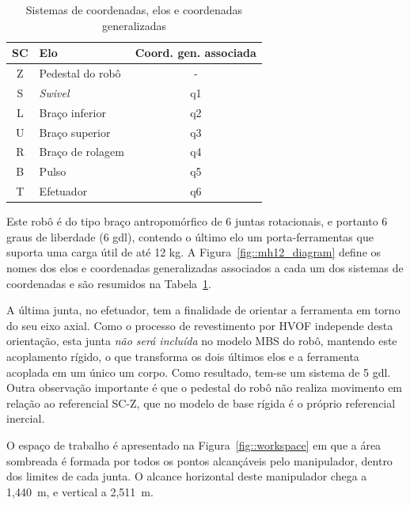 \begin{table}[h]
\centering
\caption{Sistemas de coordenadas, elos e coordenadas generalizadas}
\label{tab::resumo_mh12}
\begin{tabular}{@{}clc@{}}
\toprule
SC & Elo              & \multicolumn{1}{l}{Coord. gen. associada} \\ \midrule
Z  & Pedestal do robô & -                                         \\
S  & \textit{Swivel}  & q1                                        \\
L  & Braço inferior   & q2                                        \\
U  & Braço superior   & q3                                        \\
R  & Braço de rolagem & q4                                        \\
B  & Pulso            & q5                                        \\
T  & Efetuador        & q6                                        \\ \bottomrule
\end{tabular}
\end{table}

Este robô é do tipo braço antropomórfico de 6 juntas rotacionais, e portanto 6
graus de liberdade (6 gdl), contendo o último elo um porta-ferramentas que
suporta uma carga útil de até 12 kg. A Figura~\ref{fig::mh12_diagram} define
os nomes dos elos e coordenadas generalizadas associados a cada um dos sistemas
de coordenadas e são resumidos na Tabela~\ref{tab::resumo_mh12}.

A última junta, no efetuador, tem a finalidade de orientar a ferramenta em torno
do seu eixo axial. Como o processo de revestimento por HVOF independe desta
orientação, esta junta \emph{não será incluída} no modelo MBS do robô, mantendo
este acoplamento rígido, o que transforma os dois últimos elos e a ferramenta
acoplada em um único um corpo. Como resultado, tem-se um sistema de 5 gdl. Outra
observação importante é que o pedestal do robô não realiza movimento em relação
ao referencial SC-Z, que no modelo de base rígida é o próprio referencial
inercial.

O espaço de trabalho é apresentado na Figura~\ref{fig::workspace} em que a área
sombreada é formada por todos os pontos alcançáveis pelo manipulador, dentro dos
limites de cada junta. O alcance horizontal deste manipulador chega a 1,440~m, e
vertical a 2,511~m.

